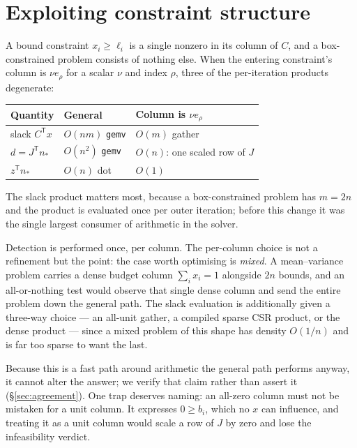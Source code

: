 \documentclass[11pt,a4paper]{article}
\theoremstyle{plain}
\theoremstyle{remark}
\newcommand{\T}{^{\mathsf{T}}}
\begin{document}
\section{Exploiting constraint structure}
\label{sec:structure}

A bound constraint $x_i \ge \ell_i$ is a single nonzero in its column of $C$, and
a box-constrained problem consists of nothing else. When the entering
constraint's column is $\nu e_\rho$ for a scalar $\nu$ and index $\rho$, three of
the per-iteration products degenerate:

\begin{center}
\begin{tabular}{lll}
  \toprule
  Quantity & General & Column is $\nu e_\rho$ \\
  \midrule
  slack $C\T x$          & $O(nm)$ \texttt{gemv} & $O(m)$ gather \\
  $d = J\T n_\ast$       & $O(n^2)$ \texttt{gemv} & $O(n)$: one scaled row of $J$ \\
  $z\T n_\ast$           & $O(n)$ dot            & $O(1)$ \\
  \bottomrule
\end{tabular}
\end{center}

The slack product matters most, because a box-constrained problem has $m = 2n$
and the product is evaluated once per outer iteration; before this change it was
the single largest consumer of arithmetic in the solver.

Detection is performed once, per column. The per-column choice is not a
refinement but the point: the case worth optimising is \emph{mixed}. A
mean--variance problem \citep{markowitz1952} carries a dense budget column
$\sum_i x_i = 1$ alongside $2n$ bounds, and an all-or-nothing test would observe
that single dense column and send the entire problem down the general path. The
slack evaluation is additionally given a three-way choice --- an all-unit gather,
a compiled sparse CSR product, or the dense product --- since a mixed problem of
this shape has density $O(1/n)$ and is far too sparse to want the last.

Because this is a fast path around arithmetic the general path performs anyway,
it cannot alter the answer; we verify that claim rather than assert it
(\S\ref{sec:agreement}). One trap deserves naming: an all-zero column must not be
mistaken for a unit column. It expresses $0 \ge b_i$, which no $x$ can influence,
and treating it as a unit column would scale a row of $J$ by zero and lose the
infeasibility verdict.
\end{document}
